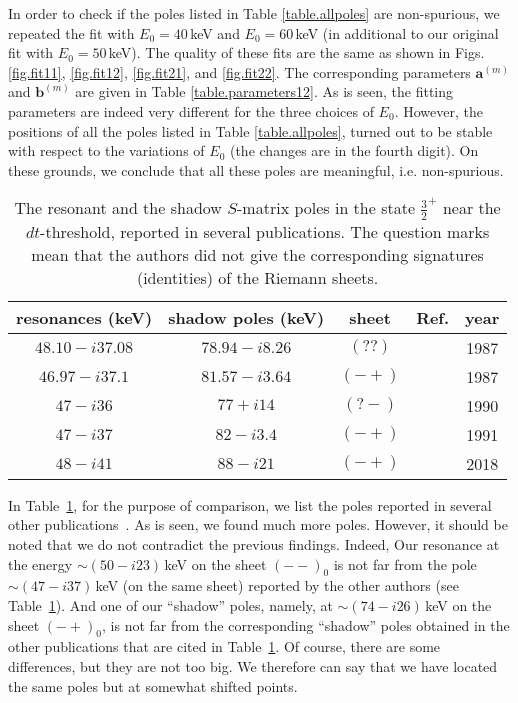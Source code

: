\documentclass[12pt]{article}
\begin{document}
In order to check if the poles listed in Table \ref{table.allpoles}
are non-spurious, we repeated the fit with
$E_0=40$\,keV and $E_0=60$\,keV (in additional to our original fit with
$E_0=50$\,keV). The quality of these fits are the same as shown in Figs.
\ref{fig.fit11}, \ref{fig.fit12}, \ref{fig.fit21}, and \ref{fig.fit22}. The
corresponding parameters $\bm{a}^{(m)}$ and $\bm{b}^{(m)}$ are given in Table
\ref{table.parameters12}. As is
seen, the fitting parameters are indeed very different for the three choices of
$E_0$. However, the positions of all the poles listed in Table
\ref{table.allpoles}, turned out to be stable with respect to the
variations of $E_0$ (the changes are in the fourth
digit). On these grounds, we conclude that all these poles are meaningful, i.e.
non-spurious.

\begin{table}
\begin{center}
\begin{tabular}{|c|c|c|c|c|}
\hline
\sffamily resonances (keV) & \sffamily shadow poles (keV) &
\sffamily sheet & \sffamily Ref. & \sffamily year\\
\hline
$48.10-i37.08$ & $78.94-i8.26$ & $(??)$ & \cite{Brown} & 1987\\
\hline
$46.97-i37.1$ & $81.57-i3.64$ & $(-+)$ & \cite{PRL59} & 1987\\
\hline
$47-i36$ & $77+i14$ & $(?-)$ & \cite{Karnakov} & 1990\\
\hline
$47-i37$ & $82-i3.4$ & $(-+)$ & \cite{Bogdanova} & 1991\\
\hline
$48-i41$ & $88-i21$ & $(-+)$ & \cite{betan} & 2018\\
\hline
\end{tabular}
\end{center}
\caption{\sf
The resonant and the shadow $S$-matrix poles in the state $\frac32^+$ near the
$dt$-threshold, reported in several publications. The question marks mean that
the authors did not give the corresponding signatures (identities) of the
Riemann sheets.
}
\label{table.comparison}
\end{table}

In Table~\ref{table.comparison}, for the purpose of comparison, we list the
poles reported in several other publications~\cite{Brown, PRL59, Karnakov,
Bogdanova, betan}. 
As is seen, we found much more
poles. However, it should be noted that we do not contradict the 
previous findings. Indeed, Our resonance at the energy $\sim(50-i23)$\,keV on 
the sheet $(--)_0$ is not far from the pole $\sim(47-i37)$\,keV (on the same 
sheet) reported by the other authors (see Table~\ref{table.comparison}). And one 
of our ``shadow'' poles, namely, at $\sim(74-i26)$\,keV on the sheet $(-+)_0$, 
is not far from the corresponding ``shadow'' poles obtained in the other 
publications that are cited in Table~\ref{table.comparison}.
Of course, there are some differences, but they are not too big. We therefore 
can say that we have located the same poles but at somewhat shifted points. 
\end{document}
